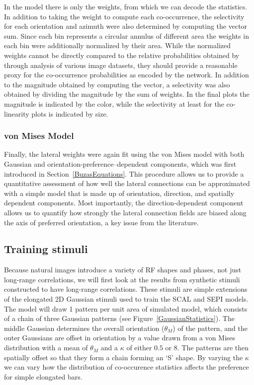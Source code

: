 In the model there is only the weights, from which we can decode the
statistics. In addition to taking the weight to compute each
co-occurrence, the selectivity for each orientation and azimuth were
also determined by computing the vector sum. Since each bin represents
a circular annulus of different area the weights in each bin were
additionally normalized by their area. While the normalized weights
cannot be directly compared to the relative probabilities obtained by
\cite{Geisler2001} through analysis of various image datasets, they
should provide a reasonable proxy for the co-occurrence probabilities
as encoded by the network. In addition to the magnitude obtained by
computing the vector, a selectivity was also obtained by dividing the
magnitude by the sum of weights. In the final plots the magnitude is
indicated by the color, while the selectivity at least for the
co-linearity plots is indicated by size.

\subsubsection*{von Mises Model}

Finally, the lateral weights were again fit using the von Mises model
with both Gaussian and orientation-preference--dependent components,
which was first introduced in Section~\ref{BuzasEquations}. This procedure
allows us to provide a quantitative assessment of how well the lateral
connections can be approximated with a simple model that is made up of
orientation, direction, and spatially dependent components. Most
importantly, the direction-dependent component allows us to quantify
how strongly the lateral connection fields are biased along the axis
of preferred orientation, a key issue from the literature.

\subsection{Training stimuli}
\label{synthetic}

Because natural images introduce a variety of RF shapes and phases,
not just long-range correlations, we will first look at the results
from synthetic stimuli constructed to have long-range correlations.
These stimuli are simple extensions of the
elongated 2D Gaussian stimuli used to train the SCAL and SEPI models.
The model will draw 1 pattern per unit area of simulated model, which consists of
a chain of three Gaussian patterns (see
Figure~\ref{GaussianStatistics}). The middle Gaussian determines the
overall orientation ($\theta_M$) of the pattern, and the outer
Gaussians are offset in orientation by a value drawn from a von Mises
distribution with a mean of $\theta_M$ and a $\kappa$ of either $0.5$
or $8$. The patterns are then spatially offset so that they form a
chain forming an `S' shape. By varying the $\kappa$ we can vary how
the distribution of co-occurence statistics affects the preference
for simple elongated bars.


